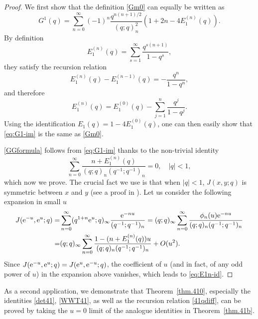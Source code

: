 \documentclass[12pt,reqno]{amsart}
\theoremstyle{definition}
\def\re{{\rm e}}
\newcommand{\nn}{\nonumber \\}
\begin{document}
\begin{proof}
  We first show that the definition \eqref{Gm0} can equally be written
  as
  \begin{equation}
    G^1(q) = \sum_{n=0}^\infty (-1)^n \frac{q^{n(n+1)/2}}{(q;q)_n^2}
    \left(1+2n-4E_1^{(n)}(q)\right).\label{eq:G1-im}
  \end{equation}
  By definition
  \begin{equation}
    E_1^{(n)}(q) = \sum_{s=1}^\infty \frac{q^{s(n+1)}}{1-q^s},
  \end{equation}
  they satisfy the recursion relation
  \begin{equation}
    E_1^{(n)}(q) - E_1^{(n-1)}(q) = -\frac{q^n}{1-q^n},
  \end{equation}
  and therefore
  \begin{equation}
    E_1^{(n)}(q) = E_1^{(0)}(q) -\sum_{j=1}^n\frac{q^j}{1-q^j}.
  \end{equation}
  Using the identification $E_1(q) = 1-4E_1^{(0)}(q)$, one can then
  easily show that \eqref{eq:G1-im} is the same
  as \eqref{Gm0}.

  \eqref{GGformula} follows from \eqref{eq:G1-im} thanks to the
  non-trivial identity
  \begin{equation}
    \sum_{n=0}^\infty \frac{n+E_1^{(n)}(q)}{(q;q)_n(q^{-1};q^{-1})_n}
    = 0,\quad |q|<1,
    \label{eq:E1n-id}
  \end{equation}
  which now we prove.
  The crucial fact we use is that when $|q|<1$, $J(x,y;q)$ is
  symmetric between $x$ and $y$ (see a proof in \cite{Beem}).
  Let us consider the following expansion in small $u$
  \begin{align}
    J(\re^{-u},\re^u;q) =
    &\sum_{n=0}^\infty (q^{1+n}\re^u;q)_\infty\frac{\re^{-nu}}{(q^{-1};q^{-1})_n} =
    (q;q)_\infty\sum_{n=0}^\infty \frac{\phi_n(u)\re^{-nu}}{(q;q)_n(q^{-1};q^{-1})_n}\nn =
    &(q;q)_\infty\sum_{n=0}^\infty \frac{1-(n+E_1^{(n)}(q))u}{(q;q)_n(q^{-1};q^{-1})_n} +
    O(u^2). 
  \end{align}
  Since $J(\re^{-u},\re^u;q) = J(\re^{u},\re^{-u};q)$, the coefficient
  of $u$ (and in fact, of any odd power of $u$) in the expansion above
  vanishes, which leads to \eqref{eq:E1n-id}.
\end{proof}

As a second application, we demonstrate that Theorem~\ref{thm.410},
especially the identities \eqref{det41}, \eqref{WWT41}, as well as the
recursion relation \eqref{41qdiff}, can be proved by taking the $u=0$
limit of the analogue identities in Theorem~\ref{thm.41b}.
\end{document}
